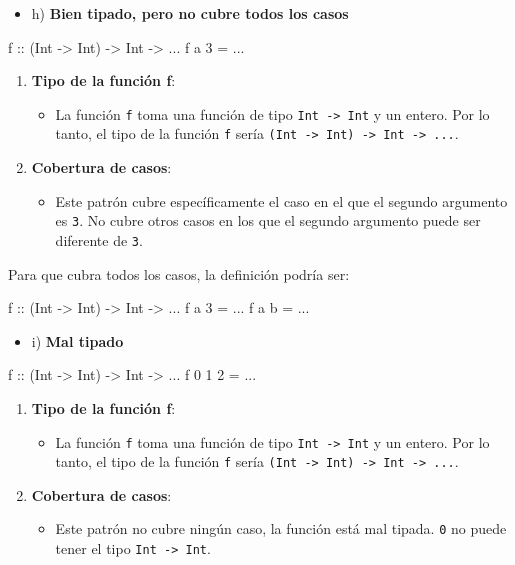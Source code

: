 \documentclass{article}
\begin{document}
                \begin{itemize}
                    \item 
                    h) \textbf{Bien tipado, pero no cubre todos los casos}
                    \end{itemize}
\begin{haskell}
f :: (Int -> Int) -> Int -> ...
f a 3 = ...
\end{haskell}
                    \begin{enumerate}
                    \item 
                    \textbf{Tipo de la función f}:
                    \begin{itemize}
                    \item 
                    La función \texttt{f} toma una función de tipo \texttt{Int -> Int} y un entero. Por lo tanto, el tipo de la función \texttt{f} sería \texttt{(Int -> Int) -> Int -> ...}.
                    \end{itemize}
                    \item 
                    \textbf{Cobertura de casos}:
                    \begin{itemize}
                    \item 
                    Este patrón cubre específicamente el caso en el que el segundo argumento es \texttt{3}. No cubre otros casos en los que el segundo argumento puede ser diferente de \texttt{3}.
                    \end{itemize}
                    \end{enumerate}
                    
                    Para que cubra todos los casos, la definición podría ser:
\begin{haskell}
f :: (Int -> Int) -> Int -> ...
f a 3 = ...   
f a b = ...   
\end{haskell}
                    
\begin{itemize}
    \item 
    i) \textbf{Mal tipado}
    \end{itemize}
\begin{haskell}
f :: (Int -> Int) -> Int -> ...
f 0 1 2 = ...
\end{haskell}
    \begin{enumerate}
    \item 
    \textbf{Tipo de la función f}:
    \begin{itemize}
    \item 
    La función \texttt{f} toma una función de tipo \texttt{Int -> Int} y un entero. Por lo tanto, el tipo de la función \texttt{f} sería \texttt{(Int -> Int) -> Int -> ...}.
    \end{itemize}
    \item 
    \textbf{Cobertura de casos}:
    \begin{itemize}
    \item 
    Este patrón no cubre ningún caso, la función está mal tipada. \texttt{0} no puede tener el tipo \texttt{Int -> Int}.
    \end{itemize}
    \end{enumerate}
    
\end{document}
